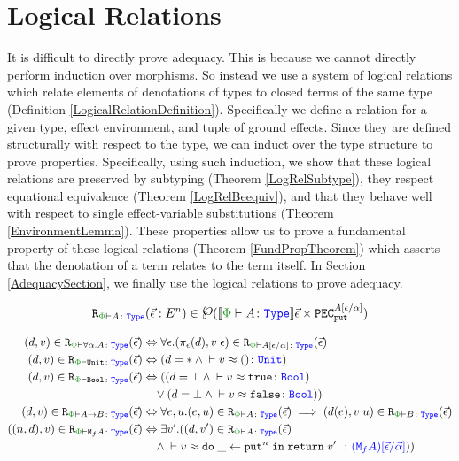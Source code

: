 \section{Logical Relations}
It is difficult to directly prove adequacy. This is because we cannot directly perform induction over morphisms. So instead we use a system of logical relations which relate elements of denotations of types to closed terms of the same type (Definition \ref{LogicalRelationDefinition}). Specifically we define a relation for a given type, effect environment, and tuple of ground effects. Since they are defined structurally with respect to the type, we can induct over the type structure to prove properties. Specifically, using such induction, we show that these logical relations are preserved by subtyping (Theorem \ref{LogRelSubtype}), they respect equational equivalence (Theorem \ref{LogRelBeequiv}), and that they behave well with respect to single effect-variable substitutions (Theorem \ref{EnvironmentLemma}). These properties allow us to prove a fundamental property of these logical relations (Theorem \ref{FundPropTheorem}) which asserts that the denotation of a term relates to the term itself. In Section \ref{AdequacySection}, we finally use the logical relations to prove adequacy.

\begin{framed}
    \begin{definition}\label{LogicalRelationDefinition}
        \begin{equation}
            \label{LogicalRelationType}
            \erelates{\P}{A}(\ev: E^n) \in \powset{\deno{\wellformedt{\P}{A}}\ev\times \pecput^{A\ssub{\a}{\e}}}
        \end{equation}
   
        \begin{align*}
            \inLogRelPE{d}{v}{\all{\a}{A}} 
            & \Leftrightarrow \forall\e. (\pe(d), \eapp{v}{\e})\in\erelates{\P}{A\ssub{\a}{\e}}(\ev)\\
                    \inLogRelPE{d}{v}{\U} & \Leftrightarrow (d=\singleton \wedge \zberelation{v}{()}{\U})
                    \\
                    \inLogRelPE{d}{v}{\B} & \Leftrightarrow ((d=\top \wedge \zberelation{v}{\t}{\B}) 
                    \\& \quad\vee (d=\bot \wedge \zberelation{v}{\f}{\B}))
                    \\
                    \inLogRelPE{d}{v}{\ab}  &\Leftrightarrow \forall e, u. (e, u)\in\erelates{\P}{A}(\ev) \implies (d(e), \apply{v}{u})\in \erelates{\P}{B}(\ev)
                    \\
                    \inLogRelPE{(n, d)}{v}{\M{f}{A}} &\Leftrightarrow \exists v'. (\inLogRelPE{d}{v'}{A}
                    \\ & \quad\wedge  \zberelation{v}{\doin{\_}{\put^n}{\return{v'}}}{(\M{f}{A})\ssub{\av}{\ev}}))
        \end{align*}
    \end{definition}
        
\end{framed}

